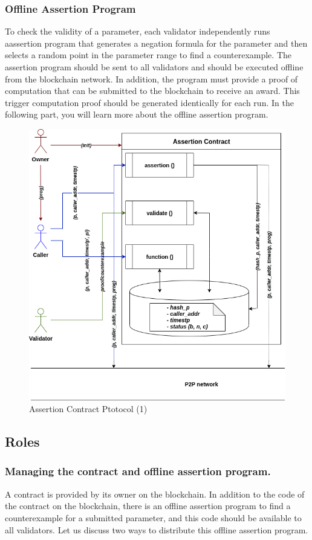 \documentclass[runningheads]{llncs}
\begin{document}
\subsubsection{Offline Assertion Program}
To check the validity of a parameter, each validator independently runs aassertion program that generates a negation formula for the parameter and then selects a random point in the parameter range to find a counterexample. The assertion program should be sent to all validators and should be executed offline from the blockchain network. In addition, the program must provide a proof of computation that can be submitted to the blockchain to receive an award. This trigger computation proof should be generated identically for each run. In the following part, you will learn more about the offline assertion program.
\begin{figure}
\centering
\includegraphics[scale=.6]{assertion_1}
\caption{Assertion Contract Ptotocol (1)}
\end{figure}

\subsection{Roles}
\subsubsection{Managing the contract and offline assertion program.}
A contract is provided by its owner on the blockchain. In addition to the code of the contract on the blockchain, there is an offline assertion program to find a counterexample for a submitted parameter, and this code should be available to all validators. Let us discuss two ways to distribute this offline assertion program.
\end{document}
